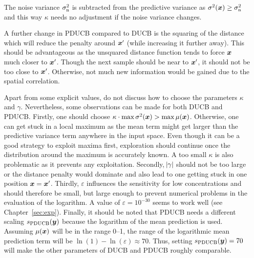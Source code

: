 The noise variance $\sigma_{\mathrm{n}}^2$ is subtracted from the predictive variance 
as $\sigma^2(\bm{x}) \geq \sigma_{\mathrm{n}}^2$ and this way $\kappa$ needs no 
adjustment if the noise variance changes.

A further change in PDUCB compared to DUCB is the squaring of the distance which 
will reduce the penalty around $\bm{x}'$ (while increasing it further away).  
This should be advantageous as the unsquared distance function tends to force 
$\bm{x}$ much closer to $\bm{x}'$. Though the next sample should be near to $\bm{x}'$, it should not be too close to $\bm{x}'$.  Otherwise, not much new 
information would be gained due to the spatial correlation.

Apart from some explicit values, \textcite{Marchant:2012wb} do not discuss how 
to choose the parameters $\kappa$ and $\gamma$. Nevertheless, some observations 
can be made for both DUCB and PDUCB\@. Firstly, one should choose $\kappa \cdot 
\max \sigma^2(\bm{x}) > \max \mu(\bm{x})$. Otherwise, one can get stuck in a local 
maximum as the mean term might get larger than the predictive variance term 
anywhere in the input space. Even though it can be a good strategy to exploit 
maxima first, exploration should continue once the distribution around the 
maximum is accurately known. A too small $\kappa$ is also problematic as it 
prevents any exploitation. Secondly, $\abs{\gamma}$ should not be too large or 
the distance penalty would dominate and also lead to one getting stuck in one 
position $\bm{x} = \bm{x}'$. Thirdly, $\varepsilon$ influences the sensitivity for 
low concentrations and should therefore be small, but large enough to prevent 
numerical problems in the evaluation of the logarithm. A value of $\varepsilon 
= 10^{-30}$ seems to work well (see Chapter~\ref{sec:exp}).  Finally, it should 
be noted that PDUCB needs a different scaling $s_{\mathrm{PDUCB}}(\bm{y})$ because the 
logarithm of the mean prediction is used.  Assuming $\mu(\bm{x})$ will be in the 
range \numrange{0}{1}, the range of the logarithmic mean prediction term will be 
$\ln(1) - \ln(\varepsilon) \approx 70$.  Thus, setting $s_{\mathrm{PDUCB}}(\bm{y}) 
= 70$ will make the other parameters of DUCB and PDUCB roughly comparable.

